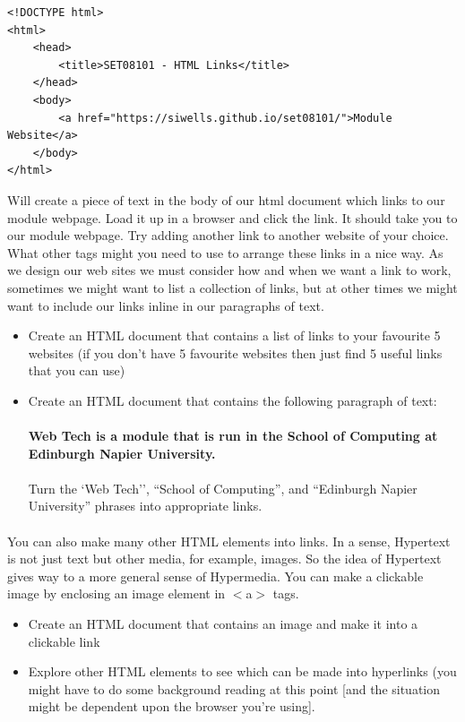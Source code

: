 \documentclass[10pt, a4paper, twosize]{article}
\begin{document}
\begin{lstlisting}
<!DOCTYPE html>
<html>
    <head>
        <title>SET08101 - HTML Links</title>
    </head>
    <body>
        <a href="https://siwells.github.io/set08101/">Module Website</a>        
    </body>
</html>
\end{lstlisting}
Will create a piece of text in the body of our html document which links to our module webpage. Load it up in a browser and click the link. It should take you to our module webpage. Try adding another link to another website of your choice. What other tags might you need to use to arrange these links in a nice way. As we design our web sites we must consider how and when we want a link to work, sometimes we might want to list a collection of links, but at other times we might want to include our links inline in our paragraphs of text.

\begin{itemize}
\item Create an HTML document that contains a list of links to your favourite 5 websites (if you don't have 5 favourite websites then just find 5 useful links that you can use)
\item Create an HTML document that contains the following paragraph of text:\\\\
{\textbf{Web Tech is a module that is run in the School of Computing at Edinburgh Napier University.}}\\\\
Turn the `Web Tech'', ``School of Computing'', and ``Edinburgh Napier University'' phrases into appropriate links.
\end{itemize}

\paragraph{} You can also make many other HTML elements into links. In a sense, Hypertext is not just text but other media, for example, images. So the idea of Hypertext gives way to a more general sense of Hypermedia. You can make a clickable image by enclosing an image element in $<$a$>$ tags.

\begin{itemize}
\item Create an HTML document that contains an image and make it into a clickable link
\item Explore other HTML elements to see which can be made into hyperlinks (you might have to do some background reading at this point [and the situation might be dependent upon the browser you're using].
\end{itemize}
\end{document}
